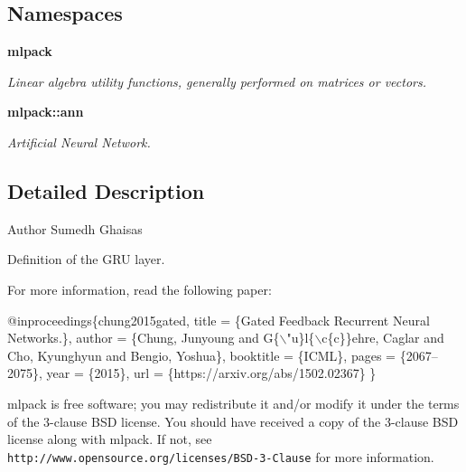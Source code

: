 \subsection*{Namespaces}
\begin{DoxyCompactItemize}
\item 
 \textbf{ mlpack}
\begin{DoxyCompactList}\small\item\em Linear algebra utility functions, generally performed on matrices or vectors. \end{DoxyCompactList}\item 
 \textbf{ mlpack\+::ann}
\begin{DoxyCompactList}\small\item\em Artificial Neural Network. \end{DoxyCompactList}\end{DoxyCompactItemize}


\subsection{Detailed Description}
\begin{DoxyAuthor}{Author}
Sumedh Ghaisas
\end{DoxyAuthor}
Definition of the G\+RU layer.

For more information, read the following paper\+:


\begin{DoxyCode}
@inproceedings\{chung2015gated,
   title     = \{Gated Feedback Recurrent Neural Networks.\},
   author    = \{Chung, Junyoung and G\{\(\backslash\)\textcolor{stringliteral}{"u\}l\{\(\backslash\)c\{c\}\}ehre, Caglar and Cho,}
\textcolor{stringliteral}{               Kyunghyun and Bengio, Yoshua\},}
\textcolor{stringliteral}{   booktitle = \{ICML\},}
\textcolor{stringliteral}{   pages     = \{2067--2075\},}
\textcolor{stringliteral}{   year      = \{2015\},}
\textcolor{stringliteral}{   url       = \{https://arxiv.org/abs/1502.02367\}}
\textcolor{stringliteral}{\}}
\end{DoxyCode}


mlpack is free software; you may redistribute it and/or modify it under the terms of the 3-\/clause B\+SD license. You should have received a copy of the 3-\/clause B\+SD license along with mlpack. If not, see {\tt http\+://www.\+opensource.\+org/licenses/\+B\+S\+D-\/3-\/\+Clause} for more information. 